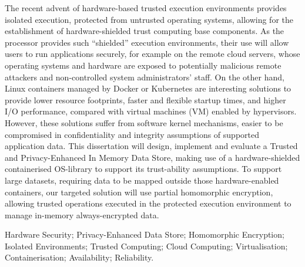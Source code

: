The recent advent of hardware-based trusted execution environments provides isolated execution, protected from untrusted operating systems, allowing for the establishment of hardware-shielded trust computing base components. As the processor provides such “shielded” execution environments, their use will allow users to run applications securely, for example on the remote cloud servers, whose operating systems and hardware are exposed to potentially malicious remote attackers and non-controlled system administrators’ staff. On the other hand, Linux containers managed by Docker or Kubernetes are interesting solutions to provide lower resource footprints, faster and flexible startup times, and higher I/O performance, compared with virtual machines (VM) enabled by hypervisors. However, these solutions suffer from software kernel mechanisms, easier to be compromised in confidentiality and integrity assumptions of supported application data.
This dissertation will design, implement and evaluate a Trusted and Privacy-Enhanced In Memory Data Store, making use of a hardware-shielded containerised OS-library to support its trust-ability assumptions. To support large datasets, requiring data to be mapped outside those hardware-enabled containers, our targeted solution will use partial homomorphic encryption, allowing trusted operations executed in the protected execution environment to manage in-memory always-encrypted data.

\begin{keywords}
Hardware Security; Privacy-Enhanced Data Store; Homomorphic Encryption; Isolated Environments; Trusted Computing; Cloud Computing; Virtualisation; Containerisation; Availability; Reliability.
\end{keywords} 
